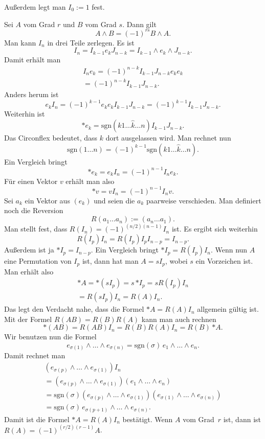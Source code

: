 \documentclass[a4paper,10pt,fleqn,twocolumn,twoside]{article}
\begin{document}
Außerdem legt man \(I_0:=1\) fest.

Sei \(A\) vom Grad \(r\) und \(B\) vom Grad \(s\). Dann gilt
\[A\wedge B = (-1)^{rs} B\wedge A.\]
Man kann \(I_n\) in drei Teile zerlegen. Es ist
\[I_n = I_{k-1}e_k J_{n-k} = I_{k-1}\wedge e_k\wedge J_{n-k}.\]
Damit erhält man
\begin{gather*}
I_n e_k = (-1)^{n-k} I_{k-1}J_{n-k}e_ke_k\\
= (-1)^{n-k} I_{k-1}J_{n-k}.
\end{gather*}
Anders herum ist
\[e_k I_n =  (-1)^{k-1} e_ke_k I_{k-1}J_{n-k}
= (-1)^{k-1} I_{k-1}J_{n-k}.\]
Weiterhin ist
\[*e_k = \mathrm{sgn}(k1\ldots\hat k\ldots n)I_{k-1}J_{n-k}.\]
Das Circonflex bedeutet, dass \(k\) dort ausgelassen wird.
Man rechnet nun
\[\mathrm{sgn}(1\ldots n) = (-1)^{k-1}
\mathrm{sgn}(k1\ldots\hat k\ldots n).\]
Ein Vergleich bringt
\[*e_k = e_k I_n = (-1)^{n-1} I_n e_k.\]
Für einen Vektor \(v\) erhält man also
\[*v = vI_n = (-1)^{n-1}I_n v.\]
Sei \(a_k\) ein Vektor aus \((e_k)\) und seien die \(a_k\)
paarweise verschieden.
Man definiert noch die Reversion
\[R(a_1\ldots a_n) := (a_n\ldots a_1).\]
Man stellt fest, dass \(R(I_n)=(-1)^{(n/2)(n-1)}I_n\) ist.
Es ergibt sich weiterhin
\[R(I_p)I_n = R(I_p)I_p I_{n-p} = I_{n-p}.\]
Außerdem ist ja \(*I_p = I_{n-p}\). Ein Vergleich bringt \(*I_p = R(I_p)I_n\).
Wenn nun \(A\) eine Permutation von \(I_p\) ist, dann hat man \(A=sI_p\),
wobei \(s\) ein Vorzeichen ist. Man erhält also
\begin{gather*}
*A = *(sI_p) = s\,{*I_p} = sR(I_p)I_n\\
= R(sI_p)I_n = R(A)I_n.
\end{gather*}
Das legt den Verdacht nahe, dass die Formel
\(*A=R(A)I_n\) allgemein gültig ist.
Mit der Formel \(R(AB) = R(B)R(A)\) kann man auch rechnen
\[*(AB) = R(AB)I_n = R(B)R(A)I_n = R(B)\,{*A}.\]
Wir benutzen nun die Formel
\[e_{\sigma(1)}\wedge\ldots\wedge e_{\sigma(n)}
= \mathrm{sgn}(\sigma)\, e_1\wedge\ldots\wedge e_n.\]
Damit rechnet man
\begin{gather*}
(e_{\sigma(p)}\wedge\ldots\wedge e_{\sigma(1)})I_n\\
= (e_{\sigma(p)}\wedge\ldots\wedge e_{\sigma(1)})
(e_1\wedge\ldots\wedge e_n)\\
= \mathrm{sgn}(\sigma)(e_{\sigma(p)}\wedge\ldots\wedge e_{\sigma(1)})
(e_{\sigma(1)}\wedge\ldots\wedge e_{\sigma(n)})\\
= \mathrm{sgn}(\sigma)\, e_{\sigma(p+1)}\wedge\ldots\wedge e_{\sigma(n)}.
\end{gather*}
Damit ist die Formel \(*A=R(A)I_n\) bestätigt.
Wenn \(A\) vom Grad~\(r\) ist, dann ist
\(R(A) = (-1)^{(r/2)(r-1)}A\).
\end{document}
